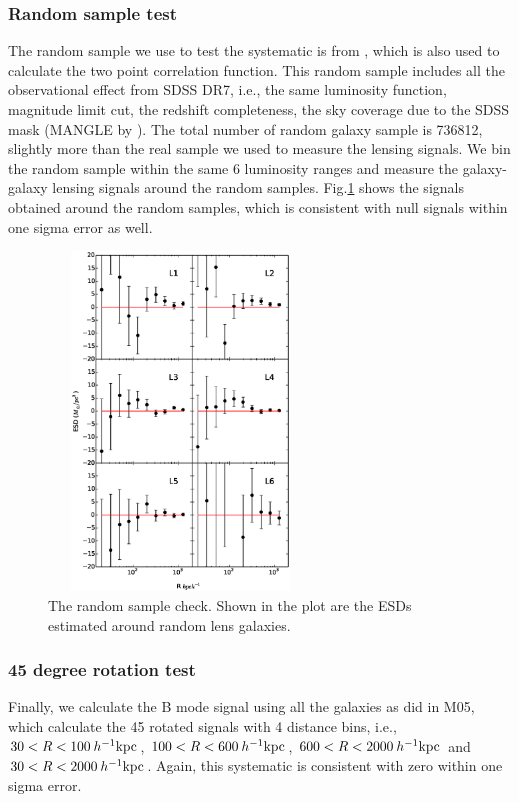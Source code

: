 \documentclass[apj]{emulateapj}
\newcommand{\kpch}{\>h^{-1}{\rm {kpc}}}
\begin{document}
\subsubsection{Random sample test}

The random sample we use to test the systematic is from
\citep{Yang2012}, which is also used to calculate the two point
correlation function. This random sample includes all the
observational effect from SDSS DR7, i.e., the same luminosity
function, magnitude limit cut, the redshift completeness, the sky
coverage due to the SDSS mask (MANGLE by \citet{Hamilton2004}). The
total number of random galaxy sample is 736812, slightly more than
the real sample we used to measure the lensing signals. We bin the
random sample within the same 6 luminosity ranges and measure the
galaxy-galaxy lensing signals around the random
samples. Fig.\ref{fig:test2} shows the signals obtained around the
random samples, which is consistent with null signals within one sigma
error as well.


\begin{figure}
\centering
\includegraphics[width=7cm,height=9cm]{f12.eps}
\caption{The random sample check. Shown in the plot are the ESDs
  estimated around random lens galaxies.}
  \label{fig:test2}
\end{figure}


\subsubsection{45 degree rotation test}

Finally, we calculate the B mode signal using all the galaxies as did
in M05, which calculate the 45 rotated signals with 4 distance bins,
i.e., $30 <R<100\kpch$, $100 <R<600\kpch$, $600<R<2000\kpch$ and $30
<R<2000\kpch$.  Again, this systematic is consistent with zero within
one sigma error.
\end{document}

